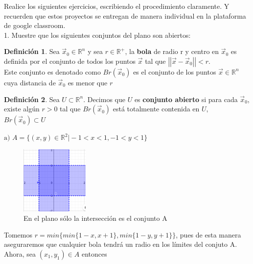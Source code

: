 \documentclass[letterpaper]{article}
\providecommand{\norm}[1]{\left|\left|#1\right|\right|}
\newcommand{\R}{\mathds{R}}
\renewcommand{\*}{\cdot}
\theoremstyle{definition}
\newtheorem{definition}{Definición}
\begin{document}
\noindent Realice los siguientes ejercicios, escribiendo el procedimiento claramente. Y recuerden que estos proyectos se entregan de manera individual en la plataforma de google classroom. \\[0.5cm]
1.  Muestre que los siguientes conjuntos del plano son abiertos: 
\begin{definition}
	Sea $ \vec{x}_0  \in \R^n$  y sea $ r \in \R^+ $, la \textbf{bola} de radio r y centro en $ \vec{x}_0 $ es definida por el conjunto de todos los puntos $ \vec{x} $ tal que $ \norm{\vec{x} - \vec{x}_0} < r $.\\ Este conjunto es denotado como $ Br(\vec{x}_0) $ es el conjunto de los puntos $ \vec{x} \in \R^n $ cuya distancia de $ \vec{x}_0 $ es menor que $ r $
\end{definition}

\begin{definition}
	Sea $ U \subset \R^n $. Decimos que $ U $ es \textbf{conjunto abierto} si para cada $ \vec{x}_0 $, existe algún $ r>0 $ tal que $ Br(\vec{x}_0) $ está totalmente contenida en $ U $, $ Br(\vec{x}_0) \subset U $

\end{definition}

$\text{a) } A = \{ (x,y) \in \mathbb{R}^2 \vert - 1 < x < 1, - 1 < y < 1 \}$
\begin{figure}[h!]
	\centering
	\includegraphics[width=0.3\textwidth]{1a}
	\caption{En el plano sólo la intersección es el conjunto A}
\end{figure}

Tomemos $ r = min\{min \{  1- x, x + 1\}, min\{ 1-y, y+1 \} \}$, pues de esta manera aseguraremos que cualquier bola tendrá un radio en los límites del conjuto A. Ahora, sea $ (x_1, y_1) \in A $ entonces 
\end{document}
